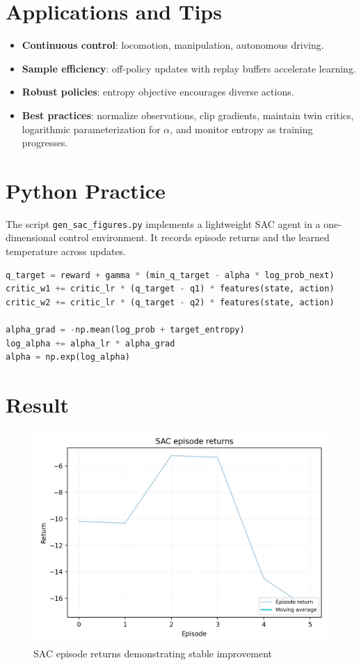 ﻿\documentclass[12pt]{article}
\begin{document}
\section{Applications and Tips}
\begin{itemize}
  \item \textbf{Continuous control}: locomotion, manipulation, autonomous driving.
  \item \textbf{Sample efficiency}: off-policy updates with replay buffers accelerate learning.
  \item \textbf{Robust policies}: entropy objective encourages diverse actions.
  \item \textbf{Best practices}: normalize observations, clip gradients, maintain twin critics, logarithmic parameterization for \(\alpha\), and monitor entropy as training progresses.
\end{itemize}

\section{Python Practice}
The script \texttt{gen\_sac\_figures.py} implements a lightweight SAC agent in a one-dimensional control environment. It records episode returns and the learned temperature across updates.
\begin{lstlisting}[language=Python,caption={Excerpt from gen_sac_figures.py}]
q_target = reward + gamma * (min_q_target - alpha * log_prob_next)
critic_w1 += critic_lr * (q_target - q1) * features(state, action)
critic_w2 += critic_lr * (q_target - q2) * features(state, action)

alpha_grad = -np.mean(log_prob + target_entropy)
log_alpha += alpha_lr * alpha_grad
alpha = np.exp(log_alpha)
\end{lstlisting}

\section{Result}
\begin{figure}[H]
  \centering
  \includegraphics[width=0.8\linewidth]{sac_returns.png}
  \caption{SAC episode returns demonstrating stable improvement}
  \label{fig:sac_returns}
\end{figure}
\end{document}
